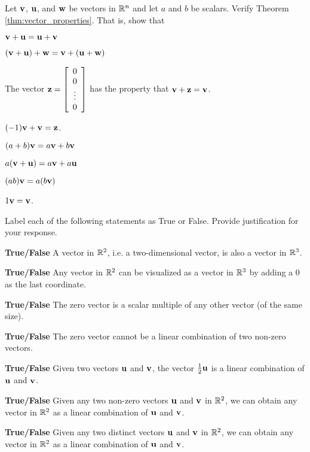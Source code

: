 \item Let $\mathbf{v}$, $\mathbf{u}$, and $\mathbf{w}$ be vectors in $\mathbb{R}^n$ and let $a$ and $b$ be scalars. Verify Theorem \ref{thm:vector_properties}. That is, show that 
	\ba
	\item $\mathbf{v} + \mathbf{u} = \mathbf{u} + \mathbf{v}$
	\item $(\mathbf{v} + \mathbf{u}) + \mathbf{w} = \mathbf{v} + (\mathbf{u} + \mathbf{w})$
	\item The vector $\mathbf{z} = \left[ \begin{array}{c} 0 \\ 0 \\ \vdots \\ 0 \end{array} \right]$ has the property that $\mathbf{v} + \mathbf{z} = \mathbf{v}$. 
	\item  $(-1)\mathbf{v} + \mathbf{v} = \mathbf{z}$. 
	\item $(a+b) \mathbf{v} = a\mathbf{v} + b\mathbf{v}$
	\item $a(\mathbf{v} + \mathbf{u}) = a\mathbf{v} + a\mathbf{u}$
	\item $(ab) \mathbf{v} = a(b\mathbf{v})$
	\item $1 \mathbf{v} = \mathbf{v}$.
	\ea


\item Label each of the following statements as True or False. Provide justification for your response.
\ba
\item \textbf{True/False} A vector in $\mathbb{R}^2$, i.e. a two-dimensional vector, is also a vector in $\mathbb{R}^3$.

\item \textbf{True/False} Any vector in $\mathbb{R}^2$ can be visualized as a vector in $\mathbb{R}^3$ by adding a 0 as the last coordinate.

\item \textbf{True/False} The zero vector is a scalar multiple of any other vector (of the same size).

\item \textbf{True/False} The zero vector cannot be a linear combination of two non-zero vectors.

\item \textbf{True/False} Given two vectors $\mathbf{u}$ and $\mathbf{v}$, the vector $\frac{1}{2}\mathbf{u}$ is a linear combination of $\mathbf{u}$ and $\mathbf{v}$.

\item \textbf{True/False} Given any two non-zero vectors $\mathbf{u}$ and $\mathbf{v}$ in $\mathbb{R}^2$, we can obtain any vector in $\mathbb{R}^2$ as a linear combination of $\mathbf{u}$ and $\mathbf{v}$.

\item \textbf{True/False} Given any two distinct vectors $\mathbf{u}$ and $\mathbf{v}$ in $\mathbb{R}^2$, we can obtain any vector in $\mathbb{R}^2$ as a linear combination of $\mathbf{u}$ and $\mathbf{v}$.

